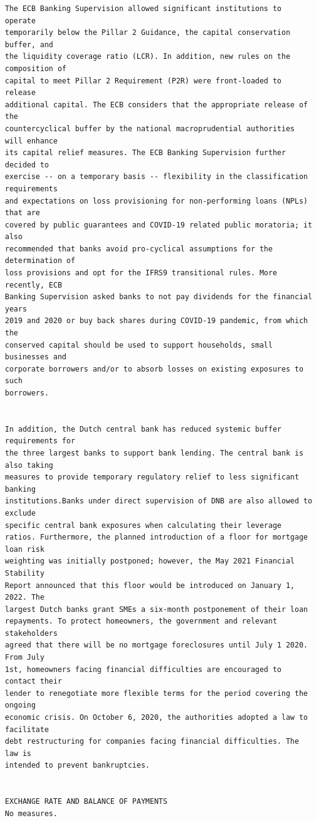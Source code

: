 \documentclass[10pt, letterpaper]{article}
\begin{document}
\begin{spacing}{1.4}
\begin{scriptsize}
\begin{spacing}{.85}
\begin{verbatim}
The ECB Banking Supervision allowed significant institutions to operate
temporarily below the Pillar 2 Guidance, the capital conservation buffer, and
the liquidity coverage ratio (LCR). In addition, new rules on the composition of
capital to meet Pillar 2 Requirement (P2R) were front-loaded to release
additional capital. The ECB considers that the appropriate release of the
countercyclical buffer by the national macroprudential authorities will enhance
its capital relief measures. The ECB Banking Supervision further decided to
exercise -- on a temporary basis -- flexibility in the classification requirements
and expectations on loss provisioning for non-performing loans (NPLs) that are
covered by public guarantees and COVID-19 related public moratoria; it also
recommended that banks avoid pro-cyclical assumptions for the determination of
loss provisions and opt for the IFRS9 transitional rules. More recently, ECB
Banking Supervision asked banks to not pay dividends for the financial years
2019 and 2020 or buy back shares during COVID-19 pandemic, from which the
conserved capital should be used to support households, small businesses and
corporate borrowers and/or to absorb losses on existing exposures to such
borrowers.


In addition, the Dutch central bank has reduced systemic buffer requirements for
the three largest banks to support bank lending. The central bank is also taking
measures to provide temporary regulatory relief to less significant banking
institutions.Banks under direct supervision of DNB are also allowed to exclude
specific central bank exposures when calculating their leverage
ratios. Furthermore, the planned introduction of a floor for mortgage loan risk
weighting was initially postponed; however, the May 2021 Financial Stability
Report announced that this floor would be introduced on January 1, 2022. The
largest Dutch banks grant SMEs a six-month postponement of their loan
repayments. To protect homeowners, the government and relevant stakeholders
agreed that there will be no mortgage foreclosures until July 1 2020. From July
1st, homeowners facing financial difficulties are encouraged to contact their
lender to renegotiate more flexible terms for the period covering the ongoing
economic crisis. On October 6, 2020, the authorities adopted a law to facilitate
debt restructuring for companies facing financial difficulties. The law is
intended to prevent bankruptcies.


EXCHANGE RATE AND BALANCE OF PAYMENTS
No measures.
\end{verbatim}
\end{spacing}
\end{scriptsize}



\end{spacing}
\end{document}
